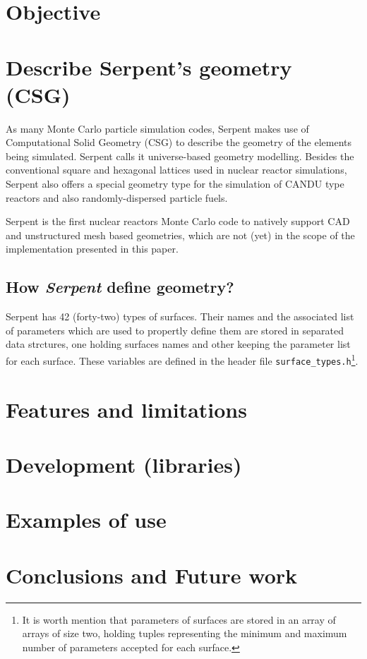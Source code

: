 \documentclass{elsarticle}
\begin{document}
\section{Objective}


\section{Describe Serpent's geometry (CSG)}

As many Monte Carlo particle simulation codes, Serpent makes use of Computational Solid Geometry (CSG) to
describe the geometry of the elements being simulated. Serpent calls it universe-based geometry modelling.
Besides the conventional square and hexagonal lattices used in nuclear reactor simulations, Serpent also
offers a special geometry type for the simulation of CANDU type reactors and also randomly-dispersed
particle fuels.

Serpent is the first nuclear reactors Monte Carlo code to natively support CAD and unstructured
mesh based geometries\cite{serpent-openfoam-mesh}, which are not (yet) in the scope of the implementation presented in this paper.

\subsection{How \textit{Serpent} define geometry?}

Serpent has 42 (forty-two) types of surfaces. Their names and the associated
list of parameters which are used to propertly define them are stored
in separated data strctures, one holding surfaces names and other keeping
the parameter list for each surface. These variables are defined in the
header file \texttt{surface\_types.h}\footnote{It is worth mention
  that parameters of surfaces are stored in an array of arrays of size
  two, holding tuples representing the minimum and maximum number of parameters
  accepted for each surface.}.


\section{Features and limitations}

\section{Development (libraries)}

\section{Examples of use}

\section{Conclusions and Future work}



\end{document}
